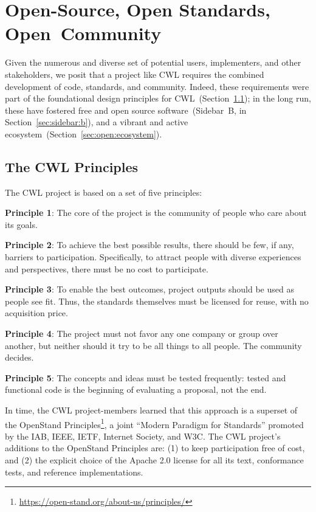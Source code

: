 {\section{Open-Source, Open Standards, Open~Community} \label{sec:open}

Given the numerous and diverse set of potential users, implementers, and other stakeholders, we posit that a project like CWL requires the combined development of code, standards, and community. Indeed, these requirements were part of the foundational design principles for CWL~(Section~\ref{sec:open:principles}); in the long run, these have fostered free and open source software~(Sidebar~B, in Section~\ref{sec:sidebar:b}), and a vibrant and active ecosystem~(Section~\ref{sec:open:ecosystem}). 

\subsection{The CWL Principles} \label{sec:open:principles}

The CWL project is based on a set of five principles:

\textbf{Principle 1}: The core of the project is the community of people who care about its goals.

\textbf{Principle 2}: To achieve the best possible results, there should be few, if any, barriers to participation. Specifically, to attract people with diverse experiences and perspectives, there must be no cost to participate.

\textbf{Principle 3}: To enable the best outcomes, project outputs should be used as people see fit. Thus, the standards themselves must be licensed for reuse, with no acquisition price.

\textbf{Principle 4}: The project must not favor any one company or group over another, but neither should it try to be all things to all people. The community decides.

\textbf{Principle 5}: The concepts and ideas must be tested frequently: tested and functional code is the beginning of evaluating a proposal, not the end.

In time, the CWL project-members learned that this approach is a superset of the OpenStand Principles\footnote{\url{https://open-stand.org/about-us/principles/}}, a joint ``Modern Paradigm for Standards'' promoted by the IAB, IEEE, IETF, Internet Society, and W3C. The CWL project's additions to the OpenStand Principles are: (1) to keep participation free of cost, and (2) the explicit choice of the Apache 2.0 license for all its text, conformance tests, and reference implementations.

}
